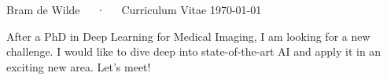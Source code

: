 \documentclass[11pt, a4paper]{awesome-cv}
\begin{document}
\makecvheader

\makecvfooter
  {}
  {Bram de Wilde~~~·~~~Curriculum Vitae}
  {\today}


After a PhD in Deep Learning for Medical Imaging, I am looking for a new challenge. I would like to dive deep into state-of-the-art AI and apply it in an exciting new area. Let's meet!








\end{document}
